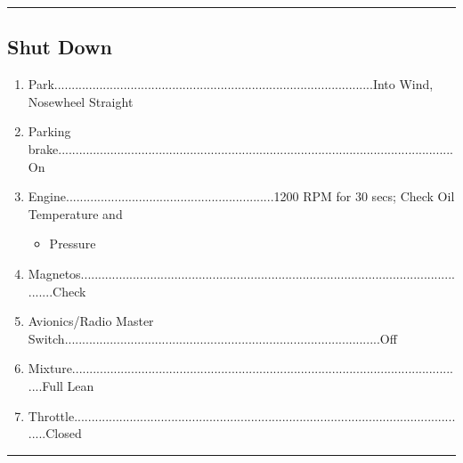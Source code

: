 \documentclass[a4paper]{article}
\newenvironment{checklist}{
  \begin{itemize}[leftmargin=*, align=left]
    \setlength{\itemsep}{2pt}
    \setlength{\parskip}{0pt}
    \setlength{\parsep}{0pt}
}{
  \end{itemize}
}
\newenvironment{numberedchecklist}{
  \begin{enumerate}[label=\arabic*., leftmargin=*, align=left]
    \setlength{\itemsep}{2pt}
    \setlength{\parskip}{0pt}
    \setlength{\parsep}{0pt}
}{
  \end{enumerate}
}
\begin{document}
\rule{\linewidth}{0.4pt}

\subsection*{Shut Down}
\begin{numberedchecklist}
\item Park............................................................................................Into Wind, Nosewheel Straight
\item Parking brake..................................................................................................................On
\item Engine............................................................1200 RPM for 30 secs; Check Oil Temperature and
  \begin{checklist}
  \item Pressure
  \end{checklist}
\item Magnetos...................................................................................................................Check
\item Avionics/Radio Master Switch...........................................................................................Off
\item Mixture..................................................................................................................Full Lean
\item Throttle...................................................................................................................Closed
\end{numberedchecklist}

\rule{\linewidth}{0.4pt}
\end{document}
